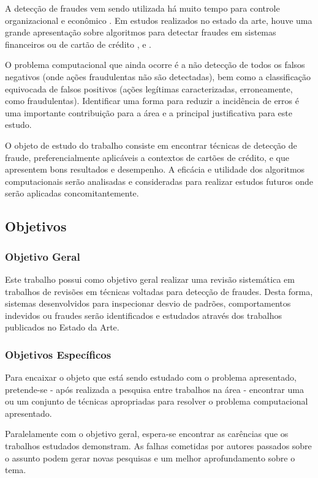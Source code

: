 \documentclass[smallextended]{svjour3}       %
\begin{document}
A detecção de fraudes vem sendo utilizada há muito tempo para controle organizacional e econômico \citep{Seyedhossein2010}. Em estudos realizados no estado da arte, houve uma grande apresentação sobre algoritmos para detectar fraudes em sistemas financeiros ou de cartão de crédito \citep{809570}, \citep{Chandola:2009:ADS:1541880.1541882} e \citep{Abdallah201690}.

O problema computacional que ainda ocorre é a não detecção de todos os falsos negativos (onde ações fraudulentas não são detectadas), bem como a classificação equivocada de falsos positivos (ações legítimas caracterizadas, erroneamente, como fraudulentas). Identificar uma forma para reduzir a incidência de erros é uma importante contribuição para a área e a principal justificativa para este estudo. 

O objeto de estudo do trabalho consiste em encontrar técnicas de detecção de fraude, preferencialmente aplicáveis a contextos de cartões de crédito, e que apresentem bons resultados e desempenho. A eficácia e utilidade dos algoritmos computacionais serão analisadas e consideradas para realizar estudos futuros onde serão aplicadas concomitantemente.

\subsection{Objetivos}

\subsubsection{Objetivo Geral}
Este trabalho possui como objetivo geral realizar uma revisão sistemática em trabalhos de revisões em técnicas voltadas para detecção de fraudes. Desta forma, sistemas desenvolvidos para inspecionar desvio de padrões, comportamentos indevidos ou fraudes serão identificados e estudados através dos trabalhos publicados no Estado da Arte.

\subsubsection{Objetivos Específicos}

Para encaixar o objeto que está sendo estudado com o problema apresentado, pretende-se - após realizada a pesquisa entre trabalhos na área - encontrar uma ou um conjunto de técnicas apropriadas para resolver o problema computacional apresentado.

Paralelamente com o objetivo geral, espera-se encontrar as carências que os trabalhos estudados demonstram. As falhas cometidas por autores passados sobre o assunto podem gerar novas pesquisas e um melhor aprofundamento sobre o tema. 
\end{document}
